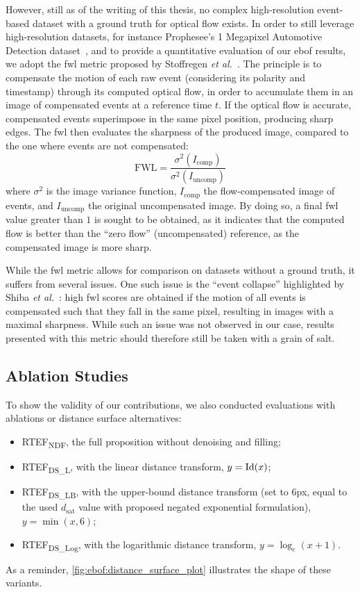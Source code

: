 However, still as of the writing of this thesis, no complex high-resolution event-based dataset with a ground truth for optical flow exists. In order to still leverage high-resolution datasets, for instance Prophesee's 1 Megapixel Automotive Detection dataset~\cite{Perot2020LearningTD}, and to provide a quantitative evaluation of our \acrshort{ebof} results, we adopt the \acrfull{fwl} metric proposed by Stoffregen \textit{et al.}~\cite{Stoffregen2020ReducingTS}. The principle is to compensate the motion of each raw event (considering its polarity and timestamp) through its computed optical flow, in order to accumulate them in an image of compensated events at a reference time \(t\). If the optical flow is accurate, compensated events superimpose in the same pixel position, producing sharp edges. The \acrshort{fwl} then evaluates the sharpness of the produced image, compared to the one where events are not compensated:
\begin{equation}
  \text{FWL} = \frac{\sigma^2(I_\text{comp})}{\sigma^2(I_\text{uncomp})}
\end{equation}
where \(\sigma^2\) is the image variance function, \(I_\text{comp}\) the flow-compensated image of events, and \(I_\text{uncomp}\) the original uncompensated image. By doing so, a final \acrshort{fwl} value greater than \(1\) is sought to be obtained, as it indicates that the computed flow is better than the ``zero flow'' (uncompensated) reference, as the compensated image is more sharp.

While the \acrshort{fwl} metric allows for comparison on datasets without a ground truth, it suffers from several issues. One such issue is the ``event collapse'' highlighted by Shiba \textit{et al.}~\cite{Shiba2022SecretsOE}: high \acrshort{fwl} scores are obtained if the motion of all events is compensated such that they fall in the same pixel, resulting in images with a maximal sharpness. While such an issue was not observed in our case, results presented with this metric should therefore still be taken with a grain of salt.

\subsection{Ablation Studies}
To show the validity of our contributions, we also conducted evaluations with ablations or distance surface alternatives:
\begin{itemize}
  \item RTEF\textsubscript{NDF}, the full proposition without denoising and filling;
  \item RTEF\textsubscript{DS\_L}, with the linear distance transform, \(y = \operatorname{Id}(x)\);
  \item RTEF\textsubscript{DS\_LB}, with the upper-bound distance transform (set to 6px, equal to the used \(d_\text{sat}\) value with proposed negated exponential formulation), \(y = \min(x, 6)\);
  \item RTEF\textsubscript{DS\_Log}, with the logarithmic distance transform, \(y = \log_e(x+1)\).
\end{itemize}
As a reminder, \cref{fig:ebof:distance_surface_plot} illustrates the shape of these variants.


